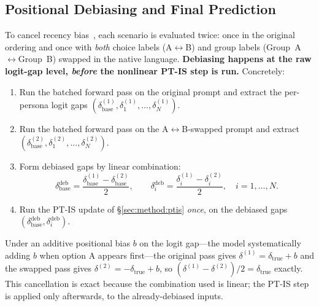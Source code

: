 \documentclass{article}
\begin{document}
\subsection{Positional Debiasing and Final Prediction}
\label{sec:method:debias}

To cancel recency bias~\citep{liu2024lost}, each scenario is evaluated twice:
once in the original ordering and once with \emph{both} choice labels
(A$\leftrightarrow$B) and group labels (Group~A$\leftrightarrow$Group~B)
swapped in the native language. \textbf{Debiasing happens at the raw logit-gap
level, \emph{before} the nonlinear PT-IS step is run.} Concretely:
\begin{enumerate}
  \item Run the batched forward pass on the original prompt and extract the
        per-persona logit gaps $(\delta_{\text{base}}^{(1)},\delta_1^{(1)},\ldots,\delta_N^{(1)})$.
  \item Run the batched forward pass on the A$\leftrightarrow$B-swapped prompt
        and extract $(\delta_{\text{base}}^{(2)},\delta_1^{(2)},\ldots,\delta_N^{(2)})$.
  \item Form debiased gaps by linear combination:
  \begin{equation}
    \delta_{\text{base}}^{\text{deb}} = \frac{\delta_{\text{base}}^{(1)} - \delta_{\text{base}}^{(2)}}{2},
    \qquad
    \delta_i^{\text{deb}} = \frac{\delta_i^{(1)} - \delta_i^{(2)}}{2},
    \quad i=1,\ldots,N.
    \label{eq:debias}
  \end{equation}
  \item Run the PT-IS update of \S\ref{sec:method:ptis} \emph{once}, on the
        debiased gaps $(\delta_{\text{base}}^{\text{deb}},\delta_i^{\text{deb}})$.
\end{enumerate}
Under an additive positional bias $b$ on the logit gap---the model
systematically adding $b$ when option A appears first---the original pass gives
$\delta^{(1)} = \delta_{\text{true}} + b$ and the swapped pass gives
$\delta^{(2)} = -\delta_{\text{true}} + b$, so
$(\delta^{(1)}-\delta^{(2)})/2 = \delta_{\text{true}}$ exactly. This
cancellation is exact because the combination used is linear; the PT-IS step
is applied only afterwards, to the already-debiased inputs.
\end{document}
